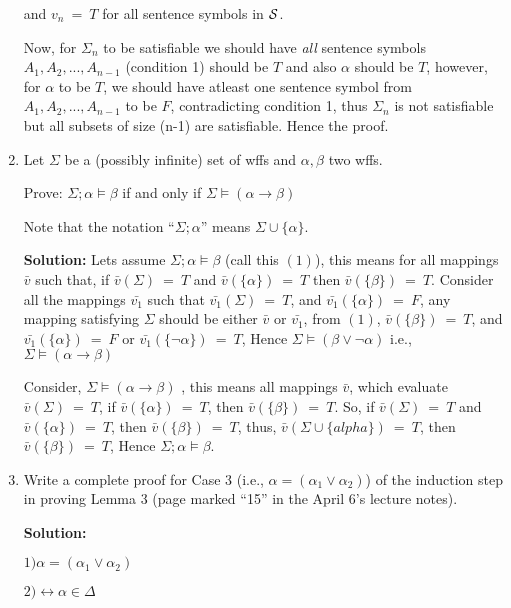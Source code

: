 \documentclass[12pt,letterpaper]{article}
\begin{document}
\begin{enumerate}
  and $v_{n}\ =\ T$ for all sentence symbols in $\cal S$.
  
  Now, for $\Sigma_{n}$ to be satisfiable we should have \textit{all} sentence symbols $A_{1}, A_{2},...,A_{n-1}$ (condition 1) should be $T$ and also $\alpha$ should be $T$, however, for $\alpha$ to be $T$, we should have atleast one sentence symbol from  $A_{1}, A_{2},...,A_{n-1}$ to be $F$, contradicting condition 1, thus $\Sigma_{n}$ is not satisfiable but all subsets of size (n-1) are satisfiable. Hence the proof.
  	
  

\item
  Let $\Sigma$ be a (possibly infinite) set of wffs and
  $\alpha,\beta$ two wffs.

  Prove: $\Sigma;\alpha\models\beta$ if and only if
  $\Sigma\models (\alpha\rightarrow\beta)$

  Note that the notation ``$\Sigma;\alpha$'' means $\Sigma\cup\{\alpha\}$.
  
  \textbf{Solution:} Lets assume $\Sigma;\alpha\models\beta$  (call this $(1)$), this means for all mappings $\bar{v}$ such that, if $\bar{v}(\Sigma)\ =\ T$ and $\bar{v}(\{\alpha\})\ =\ T$ then $\bar{v}(\{\beta\})\ =\ T$. 
  Consider all the mappings $\bar{v_{1}}$ such that $\bar{v_{1}}(\Sigma)\ =\ T$, and $\bar{v_{1}}(\{\alpha\})\ =\ F$, any mapping satisfying $\Sigma$ should be either $\bar{v}$ or $\bar{v_{1}}$, from $(1)$, $\bar{v}(\{\beta\})\ =\ T$, and $\bar{v_{1}}(\{\alpha\})\ =\ F$ or $\bar{v_{1}}(\{\lnot \alpha\})\ =\ T$, Hence $\Sigma\models (\beta \lor \lnot \alpha)$ i.e., 
$\Sigma\models (\alpha\rightarrow\beta)$

Consider, $\Sigma\models (\alpha\rightarrow\beta)$ , this means all mappings $\bar{v}$, which evaluate $\bar{v}(\Sigma)\ =\ T$, if $\bar{v}(\{\alpha\})\ =\ T$, then $\bar{v}(\{\beta\})\ =\ T$.
So, if $\bar{v}(\Sigma)\ =\ T$ and $\bar{v}(\{\alpha\})\ =\ T$, then $\bar{v}(\{\beta\})\ =\ T$, thus,
$\bar{v}(\Sigma \cup \{alpha\})\ =\ T$, then $\bar{v}(\{\beta\})\ =\ T$, Hence $\Sigma;\alpha\models\beta$.
\item
  Write a complete proof for Case 3
  (i.e., $\alpha=(\alpha_1\lor\alpha_2)$)
  of the induction step in proving
  Lemma 3 (page marked ``15'' in the April 6's lecture notes).
  
  \textbf{Solution:}
  
  
  $1) \alpha = (\alpha_{1} \lor \alpha_{2})$
  
  $2) \leftrightarrow \alpha \in \Delta$
  

\end{enumerate}
\end{document}

